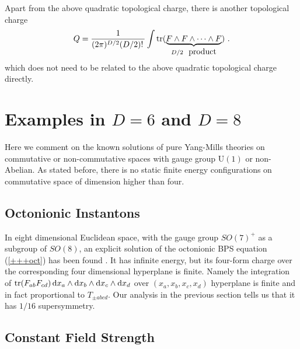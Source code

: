 \documentclass[a4paper,11pt]{article}
\def\tr{{\rm tr}}
\begin{document}
Apart from the above quadratic topological charge,  there is  another topological charge
\begin{equation}
Q=\frac{1}{(2\pi)^{D/2}(D/2)!\,}\int\tr(\underbrace{F\wedge F\wedge\cdots\wedge F}_{D/2~~{\scriptstyle\hbox{product}}})\,\,.
\end{equation}
which does not need to be related to the above quadratic topological charge directly.




\section{Examples in $D=6$ and $D=8$\label{EXAMPLE}}

Here we comment on the known solutions of pure Yang-Mills theories on commutative or non-commutative  spaces with gauge group $\mbox{U}(1)$ or
non-Abelian. As stated before, there is no static finite energy configurations on commutative space of dimension  higher than four.


\subsection{ Octonionic Instantons}


In eight dimensional Euclidean space,  with the gauge group $SO(7)^+$ as a subgroup of $SO(8)$, an explicit solution of the octonionic BPS equation
(\ref{+++oct})  has been found \cite{fubini}. It has infinite energy, but its four-form charge over the corresponding four dimensional hyperplane is
finite. Namely  the integration  of $\tr(F_{ab}F_{cd})\,{\rm d}x_{a}\wedge{\rm d}x_{b}\wedge{\rm d}x_{c}\wedge{\rm d}x_{d}$ over
$(x_{a},x_{b},x_{c},x_{d})$  hyperplane is finite and  in fact  proportional to $T_{\pm abcd}$.  Our analysis in the previous section tells us that
it has $1/16$ supersymmetry.

\subsection{Constant Field Strength}
\end{document}
